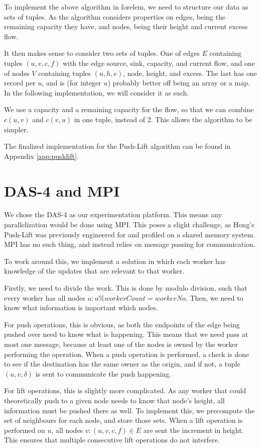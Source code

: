 To implement the above algorithm in forelem, we need to structure our data as sets of tuples. As the algorithm considers properties on edges, being the remaining capacity they have, and nodes, being their height and current excess flow.

It then makes sense to consider two sets of tuples. One of edges $E$ containing tuples $(u, v, c, f)$ with the edge source, sink, capacity, and current flow, and one of nodes $V$ containing tuples $(u, h, e)$, node, height, and excess. The last has one record per $u$, and is (for integer $u$) probably better off being an array or a map. In the following implementation, we will consider it as such.

We use a capacity and a remaining capacity for the flow, so that we can combine $c(u, v)$ and $c(v, u)$ in one tuple, instead of 2. This allows the algorithm to be simpler.

The finalized implementation for the Push-Lift algorithm can be found in Appendix \ref{app:pushlift}.

\section{DAS-4 and MPI}

We chose the DAS-4 as our experimentation platform. This means any parallelization would be done using MPI. This poses a slight challenge, as Hong's Push-Lift was previously engineered for and profiled on a shared memory system. MPI has no such thing, and instead relies on message passing for communication.

To work around this, we implement a solution in which each worker has knowledge of the updates that are relevant to that worker.

Firstly, we need to divide the work. This is done by modulo division, such that every worker has all nodes $u : u \% workerCount = workerNo$. Then, we need to know what information is important which nodes.

For push operations, this is obvious, as both the endpoints of the edge being pushed over need to know what is happening. This means that we need pass at most one message, because at least one of the nodes is owned by the worker performing the operation. When a push operation is performed, a check is done to see if the destination has the same owner as the origin, and if not, a tuple $(u, v, \delta)$ is sent to communicate the push happening.

For lift operations, this is slightly more complicated. As any worker that could theoretically push to a given node needs to know that node's height, all information must be pushed there as well. To implement this, we precompute the set of neighbours for each node, and store those sets. When a lift operation is performed on $u$, all nodes $v : (u, v, c, f) \in E$ are sent the increment in height. This ensures that multiple consecutive lift operations do not interfere.

